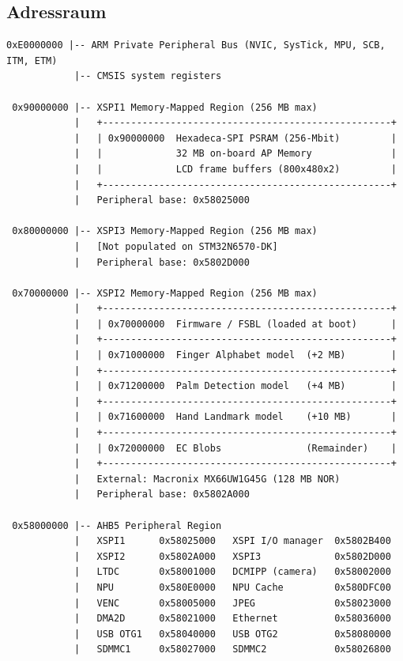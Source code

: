 \subsection{Adressraum}\label{sub:Adressraum}
\begin{lstlisting}[language={}, caption={CPU-Adressraum des Cortex-M55}, label={lst:cpu-adressraum}, numbers=none]
 0xE0000000 |-- ARM Private Peripheral Bus (NVIC, SysTick, MPU, SCB, ITM, ETM)
            |-- CMSIS system registers

 0x90000000 |-- XSPI1 Memory-Mapped Region (256 MB max)
            |   +---------------------------------------------------+
            |   | 0x90000000  Hexadeca-SPI PSRAM (256-Mbit)         |
            |   |             32 MB on-board AP Memory              |
            |   |             LCD frame buffers (800x480x2)         |
            |   +---------------------------------------------------+
            |   Peripheral base: 0x58025000

 0x80000000 |-- XSPI3 Memory-Mapped Region (256 MB max)
            |   [Not populated on STM32N6570-DK]
            |   Peripheral base: 0x5802D000

 0x70000000 |-- XSPI2 Memory-Mapped Region (256 MB max)
            |   +---------------------------------------------------+
            |   | 0x70000000  Firmware / FSBL (loaded at boot)      |
            |   +---------------------------------------------------+
            |   | 0x71000000  Finger Alphabet model  (+2 MB)        |
            |   +---------------------------------------------------+
            |   | 0x71200000  Palm Detection model   (+4 MB)        |
            |   +---------------------------------------------------+
            |   | 0x71600000  Hand Landmark model    (+10 MB)       |
            |   +---------------------------------------------------+
            |   | 0x72000000  EC Blobs               (Remainder)    |
            |   +---------------------------------------------------+
            |   External: Macronix MX66UW1G45G (128 MB NOR)
            |   Peripheral base: 0x5802A000

 0x58000000 |-- AHB5 Peripheral Region
            |   XSPI1      0x58025000   XSPI I/O manager  0x5802B400
            |   XSPI2      0x5802A000   XSPI3             0x5802D000
            |   LTDC       0x58001000   DCMIPP (camera)   0x58002000
            |   NPU        0x580E0000   NPU Cache         0x580DFC00
            |   VENC       0x58005000   JPEG              0x58023000
            |   DMA2D      0x58021000   Ethernet          0x58036000
            |   USB OTG1   0x58040000   USB OTG2          0x58080000
            |   SDMMC1     0x58027000   SDMMC2            0x58026800


\end{lstlisting}
